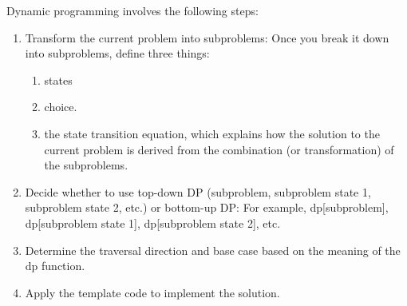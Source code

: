 \documentclass[a4paper,11pt,twoside]{book}
\begin{document}
	
%	
%	
%	
%	
	\par Dynamic programming involves the following steps:
\begin{enumerate}
	\item Transform the current problem into subproblems: Once you break it down into subproblems, define three things:
\begin{enumerate}
	\item states
	\item choice.
	\item the state transition equation, which explains how the solution to the current problem is derived from the combination (or transformation) of the subproblems.
	
\end{enumerate}
	
	
	\item Decide whether to use top-down DP (subproblem, subproblem state 1, subproblem state 2, etc.) or bottom-up DP: For example, dp[subproblem], dp[subproblem state 1], dp[subproblem state 2], etc.
	
	\item Determine the traversal direction and base case based on the meaning of the dp function.
	
	\item Apply the template code to implement the solution.
\end{enumerate}		
	
\end{document}
